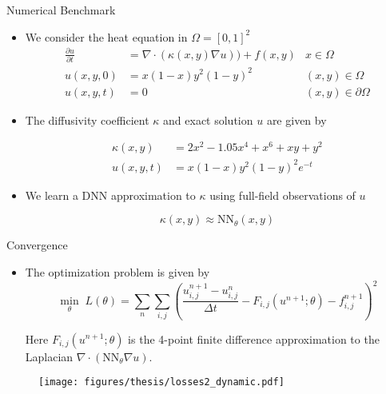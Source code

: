 \documentclass[usenames,dvipsnames]{beamer}
\begin{document}
\begin{frame}{Numerical Benchmark}
\begin{itemize}
\item We consider the heat equation in $\Omega = [0,1]^2$
\begin{equation*}
	\begin{aligned}
		\frac{\partial u}{\partial t} &= \nabla \cdot (\kappa(x, y) \nabla u))+  f(x, y) & x\in \Omega\\ 
		u(x,y,0) &= x(1-x)y^2(1-y)^2 & (x,y)\in \Omega\\
		u(x,y,t) &= 0 & (x,y)\in  \partial \Omega
	\end{aligned}
\end{equation*}

\item The diffusivity coefficient $\kappa$ and exact solution $u$ are given by 

\begin{equation*}
\begin{aligned}
	\kappa(x,y) &= 2x^2 - 1.05x^4 + x^6 +xy+y^2\\ 
	u(x,y,t) &= x(1-x)y^2(1-y)^2 e^{-t}
\end{aligned}
\end{equation*}

\item We learn a DNN approximation to $\kappa$ using full-field observations of $u$

$$\kappa(x,y) \approx \text{NN}_\theta(x, y)$$
\end{itemize}
\end{frame}


\begin{frame}{Convergence}
	\begin{itemize}
		
		\item The optimization problem is given by 
		\begin{equation}
			\min_\theta\; L(\theta) = \sum_n\sum_{i,j} \left(\frac{u_{i,j}^{n+1} - u_{i,j}^n}{\Delta t} - F_{i,j}( u^{n+1}; \theta) -  f^{n+1}_{i,j}\right)^2 
		\end{equation}
		
		Here $F_{i,j}(u^{n+1}; \theta)$ is the 4-point finite difference approximation to the Laplacian $\nabla\cdot (\text{NN}_\theta \nabla u)$.
		
	
		\end{itemize}
	
		\begin{figure}[htbp]
		\centering
		\texttt{[image: figures/thesis/losses2\_dynamic.pdf]}
	\end{figure}
	
\end{frame}
\end{document}
